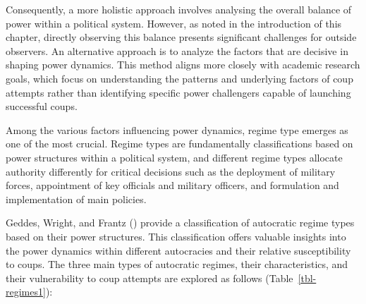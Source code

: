 \documentclass[
  12pt,
]{report}
\begin{document}
Consequently, a more holistic approach involves analysing the overall
balance of power within a political system. However, as noted in the
introduction of this chapter, directly observing this balance presents
significant challenges for outside observers. An alternative approach is
to analyze the factors that are decisive in shaping power dynamics. This
method aligns more closely with academic research goals, which focus on
understanding the patterns and underlying factors of coup attempts
rather than identifying specific power challengers capable of launching
successful coups.

Among the various factors influencing power dynamics, regime type
emerges as one of the most crucial. Regime types are fundamentally
classifications based on power structures within a political system, and
different regime types allocate authority differently for critical
decisions such as the deployment of military forces, appointment of key
officials and military officers, and formulation and implementation of
main policies.

Geddes, Wright, and Frantz () provide a
classification of autocratic regime types based on their power
structures. This classification offers valuable insights into the power
dynamics within different autocracies and their relative susceptibility
to coups. The three main types of autocratic regimes, their
characteristics, and their vulnerability to coup attempts are explored
as follows (Table~\ref{tbl-regimes1}):
\end{document}
